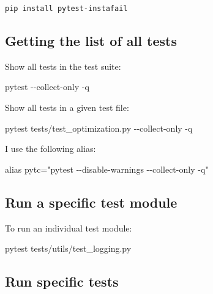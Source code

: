 \documentclass[
]{report}
\newenvironment{Shaded}{\begin{snugshade}}{\end{snugshade}}
\newcommand{\AttributeTok}[1]{\textcolor[rgb]{0.40,0.45,0.13}{#1}}
\newcommand{\BuiltInTok}[1]{\textcolor[rgb]{0.00,0.23,0.31}{#1}}
\newcommand{\ExtensionTok}[1]{\textcolor[rgb]{0.00,0.23,0.31}{#1}}
\newcommand{\NormalTok}[1]{\textcolor[rgb]{0.00,0.23,0.31}{#1}}
\newcommand{\StringTok}[1]{\textcolor[rgb]{0.13,0.47,0.30}{#1}}
\begin{document}
\begin{verbatim}
pip install pytest-instafail
\end{verbatim}

\subsection{Getting the list of all
tests}\label{getting-the-list-of-all-tests}

Show all tests in the test suite:

\begin{Shaded}
\begin{Highlighting}[]
\ExtensionTok{pytest} \AttributeTok{{-}{-}collect{-}only} \AttributeTok{{-}q}
\end{Highlighting}
\end{Shaded}

Show all tests in a given test file:

\begin{Shaded}
\begin{Highlighting}[]
\ExtensionTok{pytest}\NormalTok{ tests/test\_optimization.py }\AttributeTok{{-}{-}collect{-}only} \AttributeTok{{-}q}
\end{Highlighting}
\end{Shaded}

I use the following alias:

\begin{Shaded}
\begin{Highlighting}[]
\BuiltInTok{alias}\NormalTok{ pytc=}\StringTok{"pytest {-}{-}disable{-}warnings {-}{-}collect{-}only {-}q"}
\end{Highlighting}
\end{Shaded}

\subsection{Run a specific test
module}\label{run-a-specific-test-module}

To run an individual test module:

\begin{Shaded}
\begin{Highlighting}[]
\ExtensionTok{pytest}\NormalTok{ tests/utils/test\_logging.py}
\end{Highlighting}
\end{Shaded}

\subsection{Run specific tests}\label{run-specific-tests}
\end{document}
